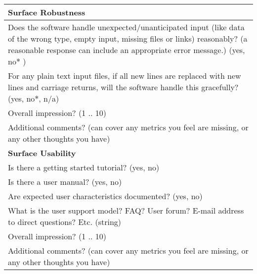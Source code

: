 \begin{table}[H]
\centering
\begin{tabular}{p{14cm}}
\hline		
\textbf{Surface Robustness}\\
\hline
Does the software handle unexpected/unanticipated input (like data of the wrong type, empty input, missing files or links) reasonably? (a reasonable response can include an appropriate error message.) ({yes, no$\ast$ })\\
For any plain text input files, if all new lines are replaced with new lines and carriage returns, will the software handle this gracefully? ({yes, no$\ast$, n/a})\\
Overall impression? ({1 .. 10})\\
Additional comments? (can cover any metrics you feel are missing, or any other thoughts you have)\\
\hline		
\textbf{Surface Usability}\\
\hline
Is there a getting started tutorial? ({yes, no})\\
Is there a user manual? ({yes, no})\\
Are expected user characteristics documented? ({yes, no})\\
What is the user support model? FAQ? User forum? E-mail address to direct questions? Etc. (string)\\
Overall impression? ({1 .. 10})\\
Additional comments? (can cover any metrics you feel are missing, or any other thoughts you have)\\
\hline
\end{tabular}
\end{table}

